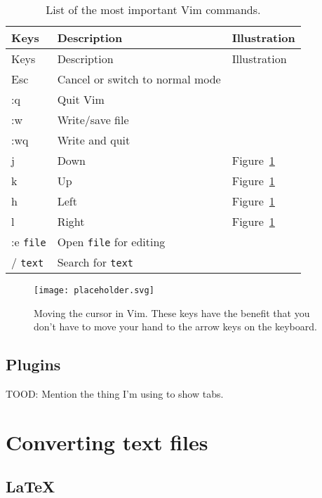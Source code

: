\documentclass[
  14pt
  american,
  paper=a4,
  ,captions=tableheading
]{scrbook}
\newcommand{\passthrough}[1]{#1}
\begin{document}
\hypertarget{tbl:vim-commands}{}
\begin{longtable}[]{@{}lll@{}}
\caption{\label{tbl:vim-commands}List of the most important Vim
commands.}\tabularnewline
\toprule
Keys & Description & Illustration \\
\midrule
\endfirsthead
\toprule
Keys & Description & Illustration \\
\midrule
\endhead
Esc & Cancel or switch to normal mode & \\
:q & Quit Vim & \\
:w & Write/save file & \\
:wq & Write and quit & \\
j & Down & Figure~\ref{fig:vim-navigation} \\
k & Up & Figure~\ref{fig:vim-navigation} \\
h & Left & Figure~\ref{fig:vim-navigation} \\
l & Right & Figure~\ref{fig:vim-navigation} \\
:e \passthrough{\lstinline!file!} & Open \passthrough{\lstinline!file!}
for editing & \\
/ \passthrough{\lstinline!text!} & Search for
\passthrough{\lstinline!text!} & \\
\bottomrule
\end{longtable}

\begin{figure}
\hypertarget{fig:vim-navigation}{%
\centering
\texttt{[image: placeholder.svg]}
\caption{Moving the cursor in Vim. These keys have the benefit that you
don't have to move your hand to the arrow keys on the
keyboard.}\label{fig:vim-navigation}
}
\end{figure}

\hypertarget{plugins}{%
\section{Plugins}\label{plugins}}

TOOD: Mention the thing I'm using to show tabs.

\hypertarget{sec:pandoc}{%
\chapter{Converting text files}\label{sec:pandoc}}

\hypertarget{latex}{%
\section{LaTeX}\label{latex}}
\end{document}
